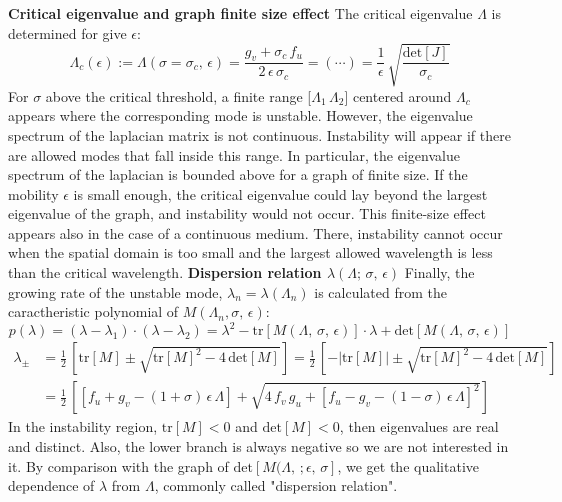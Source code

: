 \textbf{Critical eigenvalue and graph finite size effect} \newline
The critical eigenvalue $\Lambda$ is determined for give $\epsilon$:
\begin{equation}
\label{eq:critical_eigenvalue}
    \Lambda_c(\epsilon) := \Lambda(\sigma=\sigma_c,\,\epsilon) = \frac{g_v + \sigma_c\,f_u}{2\,\epsilon \,\sigma_c} = (\cdots) = \frac{1}{\epsilon}\,\sqrt{\frac{\text{det}[J]}{\sigma_c}}
\end{equation}
For $\sigma$ above the critical threshold, a finite range [$\Lambda_1\,\Lambda_2$] centered around $\Lambda_c$ appears where the corresponding mode is unstable. However, the eigenvalue spectrum of the laplacian matrix is not continuous. Instability will appear if there are allowed modes that fall inside this range.
In particular, the eigenvalue spectrum of the laplacian is bounded above for a graph of finite size. If the mobility $\epsilon$ is small enough, the critical eigenvalue could lay beyond the largest eigenvalue of the graph, and instability would not occur.
This finite-size effect appears also in the case of a continuous medium. There, instability cannot occur when the spatial domain is too small and the largest allowed wavelength is less than the critical wavelength.
\medskip \newline
\textbf{Dispersion relation $\lambda(\Lambda;\, \sigma,\,\epsilon)$} \newline
Finally, the growing rate of the unstable mode, $\lambda_n = \lambda(\Lambda_n)$ is calculated from the caractheristic polynomial of $M(\Lambda_n, \sigma,\,\epsilon)$:
\begin{equation*}
    p(\lambda) = (\lambda-\lambda_1)\cdot(\lambda-\lambda_2) = \lambda^2 - \text{tr}[M(\Lambda,\,\sigma,\,\epsilon)]\cdot \lambda + \text{det}[M(\Lambda,\,\sigma,\,\epsilon)]
\end{equation*}
\begin{align*}
    \lambda_{\pm} &=\frac{1}{2}\,\left[\text{tr}[M]\pm \sqrt{\text{tr}[M]^2-4\,\text{det}[M]}\right] = \frac{1}{2}\,\left[-|\text{tr}[M]|\pm \sqrt{\text{tr}[M]^2-4\,\text{det}[M]}\right] \\
    &= \frac{1}{2}\, \left[\left[f_u + g_v - (1+\sigma)\,\epsilon\,\Lambda\right] + \sqrt{4\,f_v\,g_u + \left[f_u - g_v -(1-\sigma)\,\epsilon\,\Lambda\right]^2}\right]
\end{align*}
In the instability region, $\text{tr}[M] <0$ and $\text{det}[M]<0$, then eigenvalues are real and distinct. Also, the lower branch is always negative so we are not interested in it. By comparison with the graph of $\text{det}[M(\Lambda,\,;\epsilon,\,\sigma]$, we get the qualitative dependence of $\lambda$ from $\Lambda$, commonly called "dispersion relation".
\newpage
